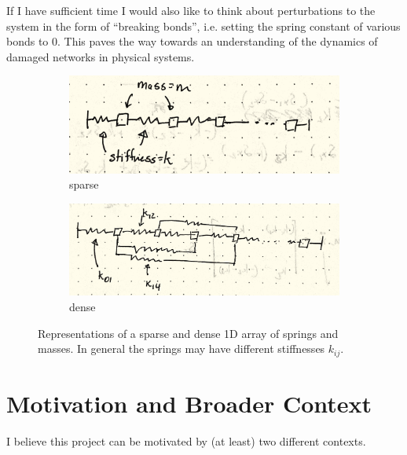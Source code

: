 \documentclass{article}
\begin{document}
If I have sufficient time I would also like to think about perturbations to the system in the form of ``breaking bonds'', 
i.e. setting the spring constant of various bonds to 0. 
This paves the way towards an understanding of the dynamics of damaged networks in physical systems. 

\begin{figure}
\begin{center}
	\begin{subfigure}[]{.45\textwidth}
	\begin{center}
		\includegraphics[width=\textwidth]{1D_sparse.png}
	\end{center}
	\caption{sparse}
	\label{fig:1D_chain}
	\end{subfigure}
	\hfill
	\begin{subfigure}[]{.45\textwidth}
	\begin{center}
		\includegraphics[width=\textwidth]{1D_dense.png}
	\end{center}
	\caption{dense}
	\label{fig:1D_dense}
	\end{subfigure}
\end{center}
\caption{Representations of a sparse and dense 1D array of springs and masses. In general the springs may have different stiffnesses $k_{ij}$.}
\label{fig:spring_arrays}
\end{figure}


\section{Motivation and Broader Context}
I believe this project can be motivated by (at least) two different contexts.
\end{document}
